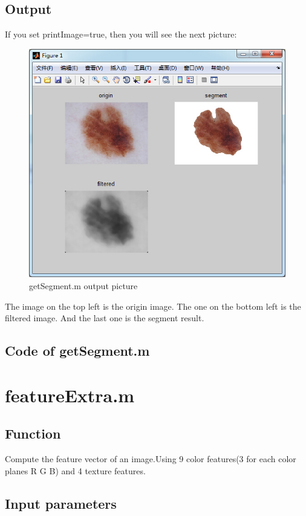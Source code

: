 \documentclass[14pt]{report} %
\begin{document}
\subsection{Output}
	If you set printImage=true, then you will see the next picture:
	\begin{figure}[H]
		\includegraphics[width=\textwidth]{image/segmentResult.jpg} 
		\caption{getSegment.m output picture} 
		 \label{fig:OutputofgetSegment} 
	\end{figure}
	The image on the top left is the origin image. The one on the bottom left is the filtered image. And the last one is the segment result.
\clearpage
\subsection{Code of getSegment.m}


\clearpage
\section{featureExtra.m}
\subsection{Function}
Compute the feature vector of an image.Using 9 color features(3 for each color planes R G B) and 4 texture features.
\subsection{Input parameters}
\end{document}
